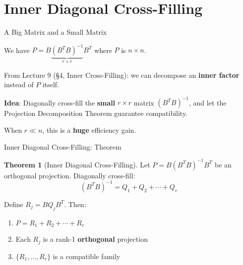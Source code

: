 \documentclass[10pt]{beamer}
\theoremstyle{definition}
\newtheorem{thm}{Theorem}[section]
\newcommand{\x}[1]{\alert{\textbf{#1}}}
\begin{document}
\section{Inner Diagonal Cross-Filling}


\begin{frame}{A Big Matrix and a Small Matrix}

We have $P = B\underbrace{(B^TB)^{-1}}_{r \times r}B^T$ where $P$ is $n \times n$.

\vspace{0.5em}

From Lecture 9 (\S4, Inner Cross-Filling): we can decompose an \x{inner factor} instead of $P$ itself.

\vspace{0.5em}

\x{Idea}: Diagonally cross-fill the \x{small} $r \times r$ matrix $(B^TB)^{-1}$, and let the Projection Decomposition Theorem guarantee compatibility.

\vspace{0.5em}

When $r \ll n$, this is a \x{huge} efficiency gain.

\end{frame}


\begin{frame}{Inner Diagonal Cross-Filling: Theorem}

\begin{thm}[Inner Diagonal Cross-Filling]
Let $P = B(B^TB)^{-1}B^T$ be an orthogonal projection. Diagonally cross-fill:
$$(B^TB)^{-1} = Q_1 + Q_2 + \cdots + Q_r$$

Define $R_j = BQ_jB^T$. Then:
\begin{enumerate}
\item $P = R_1 + R_2 + \cdots + R_r$
\item Each $R_j$ is a rank-1 \x{orthogonal} projection
\item $\{R_1, \ldots, R_r\}$ is a compatible family
\end{enumerate}
\end{thm}

\end{frame}
\end{document}
